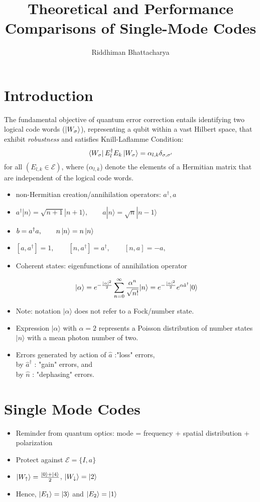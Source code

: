 \documentclass[english]{article}
\title{\huge Theoretical and Performance Comparisons of Single-Mode Codes}
\author{Riddhiman Bhattacharya}
\date{}
\begin{document}
\maketitle

\section*{Introduction}
The fundamental objective of quantum error correction entails identifying two logical code words ($\ket{W_\sigma}$), representing a qubit within a vast Hilbert space, that exhibit \textit{robustness} and satisfies Knill-Laflamme Condition: 
$$ \bra{W_\sigma} E_l^\dag E_k \ket{W_\sigma} = \alpha_{l, k} \delta_{\sigma, \sigma'}$$
for all $(E_{l,k} \in \mathcal{E})$, where ($\alpha_{l,k}$) denote the elements of a Hermitian matrix that are independent of the logical code words.

\begin{itemize}
\item non-Hermitian creation/annihilation operators: $a^\dag, a$
\item $a^{\dagger }|n\rangle ={\sqrt {n+1}}|n+1\rangle, \qquad a|n\rangle ={\sqrt {n}}|n-1\rangle$
\item $b = a^{\dag }a, \qquad n\ket{n} = n\ket{n} $
\item $[a,a^{\dag }]=1,\qquad [n,a^{\dag }]=a^{\dag },\qquad [n,a]=-a,$
\item Coherent states: eigenfunctions of annihilation operator 

$$
|\alpha\rangle =e^{-{|\alpha|^2\over2}}\sum_{n=0}^{\infty}{\alpha^n\over\sqrt{n!}}|n\rangle =e^{-{|\alpha|^2\over2}}e^{\alpha\hat a^\dagger}|0\rangle
$$

\item Note: notation ${\displaystyle |\alpha \rangle }$  does not refer to a Fock/number state.
\item Expression ${\displaystyle |\alpha \rangle } $  with $\alpha = 2$ represents a Poisson distribution of number states ${\displaystyle |n\rangle }$  with a mean photon number of two. 
\item Errors generated by action of $\hat{a}$ :"loss" errors,\\ by $\hat{a}^\dag$ : "gain" errors, and \\ by $\hat{n}$ : "dephasing" errors. 
\end{itemize}

\section*{Single Mode Codes}
\begin{itemize}
\item Reminder from quantum optics: mode = frequency + spatial distribution + polarization
\item Protect against $\mathcal{E} = \{ I,a\}$
\item $\ket{W_\uparrow} = \frac{\ket{0} + \ket{4}}{2}$, $\ket{W_\downarrow} = \ket{2}$
\item Hence, $\ket{E_1} = \ket{3}$ and $\ket{E_2} = \ket{1}$
\end{itemize}
\end{document}

